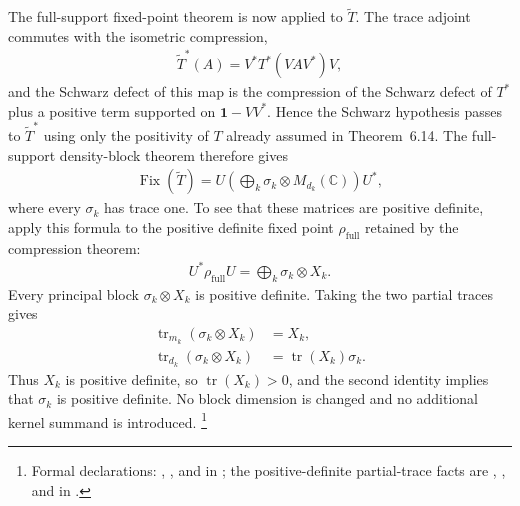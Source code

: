 \documentclass{article}
\begin{document}
The full-support fixed-point theorem is now applied to $\widetilde T$.  The
trace adjoint commutes with the isometric compression,
\begin{align}
  \widetilde T^*(A)=V^*T^*(VAV^*)V,
\end{align}
and the Schwarz defect of this map is the compression of the Schwarz defect
of $T^*$ plus a positive term supported on $\mathbf 1-VV^*$.  Hence the
Schwarz hypothesis passes to $\widetilde T^*$ using only the positivity of
$T$ already assumed in Theorem~6.14.  The full-support density-block theorem
therefore gives
\begin{align}
  \operatorname{Fix}(\widetilde T)
    =U\left(\bigoplus_k\sigma_k\otimes M_{d_k}(\mathbb C)\right)U^*,
\end{align}
where every $\sigma_k$ has trace one.  To see that these matrices are positive
definite, apply this formula to the positive definite fixed point
$\rho_{\mathrm{full}}$ retained by the compression theorem:
\begin{align}
  U^*\rho_{\mathrm{full}}U
    =\bigoplus_k\sigma_k\otimes X_k.
\end{align}
Every principal block $\sigma_k\otimes X_k$ is positive definite.  Taking the
two partial traces gives
\begin{align}
  \operatorname{tr}_{m_k}(\sigma_k\otimes X_k)&=X_k,\\
  \operatorname{tr}_{d_k}(\sigma_k\otimes X_k)
    &=\operatorname{tr}(X_k)\sigma_k.
\end{align}
Thus $X_k$ is positive definite, so $\operatorname{tr}(X_k)>0$, and the second
identity implies that $\sigma_k$ is positive definite.  No block dimension is
changed and no additional kernel summand is introduced.
\footnote{Formal declarations:
,
, and
in
; the
positive-definite partial-trace facts are
,
, and
 in
.}
\end{document}
